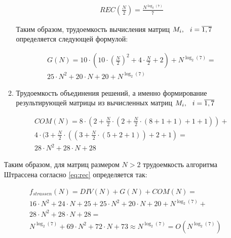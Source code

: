 \begin{itemize}[label=---]
\begin{enumerate}[label={\arabic*)}]
		\begin{equation}
			\begin{gathered}
				REC(\frac{N}{2}) = \frac{N^{\log_2(7)}}{7}
			\end{gathered}
		\end{equation}
		
		Таким образом, трудоемкость вычисления матриц $M_i, \hspace{0.25cm} i = \overline{1, 7}$ определяется следующей формулой:
		
		\begin{equation}
			\label{eq:Gfinish}
			\begin{gathered}
				G(N) = 10 \cdot (10 \cdot (\frac{N}{2})^2 + 4 \cdot \frac{N}{2} + 2) + N^{\log_2(7)} = \\
				25 \cdot N^2 + 20 \cdot N + 20 + N^{\log_2(7)}
			\end{gathered}
		\end{equation}
		
		\item Трудоемкость объединения решений, а именно формирование результирующей матрицы из вычисленных матриц $M_i, \hspace{0.25cm} i = \overline{1, 7}$
		
		\begin{equation}
			\label{eq:com}
			\begin{gathered}
				COM(N) = 8 \cdot (2 + \frac{N}{2} \cdot (2 + \frac{N}{2} \cdot (8 + 1 + 1) + 1 + 1)) + \\
				4 \cdot (3 + \frac{N}{2} \cdot ((3 + \frac{N}{2} \cdot (5 + 2 + 1)) + 2 + 1) = \\
				28 \cdot N^2 + 28 \cdot N + 28
			\end{gathered}
		\end{equation}	
	\end{enumerate}
	
	Таким образом, для матриц размером $N > 2$ трудоемкость алгоритма Штрассена согласно \ref{eq:rec} определяется так:
	
	\begin{equation}
		\label{eq:com}
		\begin{gathered}
			f_{strassen}(N) = DIV(N) + G(N) + COM(N) = \\ 16 \cdot N^2 + 24 \cdot N + 25 + 25 \cdot N^2 + 20 \cdot N + 20 + N^{\log_2(7)} + \\
		    28 \cdot N^2 + 28 \cdot N + 28 = \\
		    N^{\log_2(7)} + 69 \cdot N^2 + 72 \cdot N + 73 \approx N^{\log_2(7)} = O(N^{\log_2(7)})
		\end{gathered}
	\end{equation}
\end{itemize}

